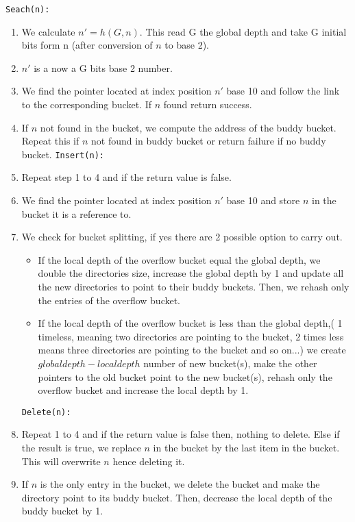 \documentclass[a4paper,12pt, openany]{book}
\begin{document}
\hspace{.11in}\texttt{Seach(n):}
\begin{enumerate}
	\item We calculate $n' = h(G, n)$. This read G the global depth and take G initial bits form n (after conversion of $n$ to base 2). 
	\item $n'$ is a now a G bits base 2 number. 
	\item We find the pointer located at index position $n'$  base 10 and follow the link to the corresponding bucket. If $n$ found return success.
	\item If $n$ not found in the bucket, we compute the address of the buddy bucket. Repeat this if $n$ not found in buddy bucket or return failure if no buddy bucket.\bigbreak
	\texttt{Insert(n):}
	\item Repeat step 1 to 4 and if the return value is false. 
	\item We find the pointer located at index position  $n'$ base 10 and store $n$ in the bucket it is a reference to. 
	\item We check for bucket splitting, if yes there are 2 possible option to carry out. 
	\begin{itemize}
		\item  If the local depth of the overflow bucket equal the global depth, we double the directories size, increase the global depth by 1 and update all the new directories to point to their buddy buckets. Then, we rehash only the entries of the overflow bucket. 
		\item If the local depth of the overflow bucket is less than the global depth,( 1 timeless, meaning two directories are pointing to the bucket, 2 times less means three directories are pointing to the bucket and so on...) we create $global depth - local depth$ number of new bucket(s), make the other pointers to the old bucket point to the new bucket(s), rehash only the overflow bucket and increase the local depth by 1.
	\end{itemize}
	\texttt{Delete(n):}
	\item Repeat 1 to 4 and if the return value is false then, nothing to delete. Else if the result is true, we replace $n$ in the bucket by the last item in the bucket. This will overwrite $n$ hence deleting it. 
	\item If $n$ is the only entry in the bucket, we delete the bucket and make the directory point to its buddy bucket. Then, decrease the local depth of the buddy bucket by 1.
\end{enumerate}
\end{document}
